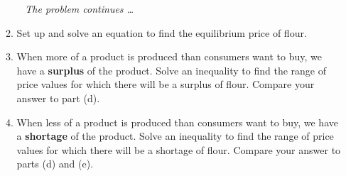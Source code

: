 \begin{enumerate}
\begin{enumerate}
\newpage %
~\hspace{-.5in} \emph{The problem continues \ldots}

\item Set up and solve an equation to find the equilibrium price of flour.\vfill
\item When more of a product is produced than consumers want to buy, we have a \textbf{surplus} of the product.  Solve an inequality to find the range of price values for which there will be a surplus of flour.  Compare your answer to part (d).  \vfill
\item When less of a product is produced than consumers want to buy, we have a \textbf{shortage} of the product.  Solve an inequality to find the range of price values for which there will be a shortage of flour. Compare your answer to parts (d) and (e).  \vfill
\end{enumerate}

\end{enumerate}


